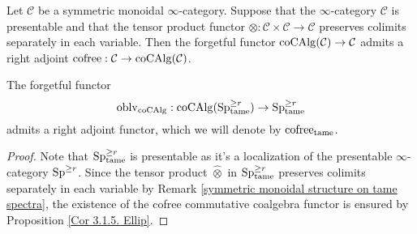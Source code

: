 \begin{proposition}
\label{Cor 3.1.5. Ellip}
\cite[Corollary 3.1.5]{LurieEllipticI}
	Let $\mathcal{C}$ be a symmetric monoidal $\infty$-category. Suppose that the $\infty$-category $\mathcal{C}$ is presentable and that the tensor product functor $\otimes: \mathcal{C} \times \mathcal{C} \rightarrow \mathcal{C}$ preserves colimits separately in each variable. Then the forgetful functor $\operatorname{coCAlg}(\mathcal{C}) \rightarrow \mathcal{C}$ admits a right adjoint $\operatorname{cofree}: \mathcal{C} \rightarrow \operatorname{coCAlg}(\mathcal{C})$.
\end{proposition}


\begin{corollary}
The forgetful functor 
$$
\operatorname{oblv}_{\operatorname{coCAlg}}:\operatorname{coCAlg}(\operatorname{Sp}_{\operatorname{\operatorname{tame}}}^{\geq r})\to \operatorname{Sp}^{\geq r}_{\operatorname{\operatorname{tame}}}
$$ admits a right adjoint functor, which we will denote by $\operatorname{cofree}_{\operatorname{\operatorname{tame}}}$.
\end{corollary}
\begin{proof}
	 Note that $\operatorname{Sp}^{\geq r}_{\operatorname{\operatorname{tame}}}$ is presentable as it's a localization of the presentable $\infty$-category $\operatorname{Sp}^{\geq r}$. 
	 Since the tensor product $\hat{\otimes}$ in $\operatorname{Sp}_{\operatorname{\operatorname{tame}}}^{\geq r}$ preserves colimits separately in each variable by Remark \ref{symmetric monoidal structure on tame spectra}, the existence of the cofree commutative coalgebra functor is ensured by Proposition \ref{Cor 3.1.5. Ellip}.
\end{proof}

